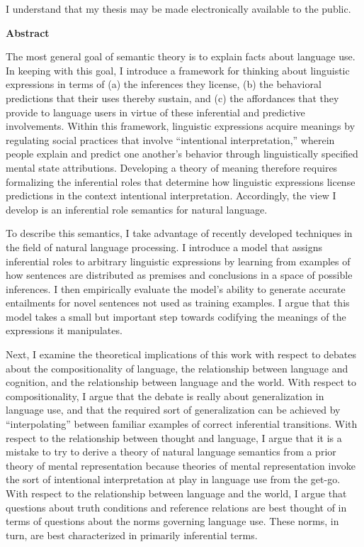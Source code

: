   \noindent
I understand that my thesis may be made electronically available to the public.

\cleardoublepage


\begin{center}\textbf{Abstract}\end{center}

The most general goal of semantic theory is to explain facts about language use. In keeping with this goal, I introduce a framework for thinking about linguistic expressions in terms of (a) the inferences they license, (b) the behavioral predictions that their uses thereby sustain, and (c) the affordances that they provide to language users in virtue of these inferential and predictive involvements. Within this framework, linguistic expressions acquire meanings by regulating social practices that involve ``intentional interpretation,'' wherein people explain and predict one another's behavior through linguistically specified mental state attributions. Developing a theory of meaning therefore requires formalizing the inferential roles that determine how linguistic expressions license predictions in the context intentional interpretation. Accordingly, the view I develop is an inferential role semantics for natural language.

To describe this semantics, I take advantage of recently developed techniques in the field of natural language processing. I introduce a model that assigns inferential roles to arbitrary linguistic expressions by learning from examples of how sentences are distributed as premises and conclusions in a space of possible inferences. I then empirically evaluate the model's ability to generate accurate entailments for novel sentences not used as training examples. I argue that this model takes a small but important step towards codifying the meanings of the expressions it manipulates.

Next, I examine the theoretical implications of this work with respect to debates about the compositionality of language, the relationship between language and cognition, and the relationship between language and the world. With respect to compositionality, I argue that the debate is really about generalization in language use, and that the required sort of generalization can be achieved by ``interpolating'' between familiar examples of correct inferential transitions. With respect to the relationship between thought and language, I argue that it is a mistake to try to derive a theory of natural language semantics from a prior theory of mental representation because theories of mental representation invoke the sort of intentional interpretation at play in language use from the get-go. With respect to the relationship between language and the world, I argue that questions about truth conditions and reference relations are best thought of in terms of questions about the norms governing language use. These norms, in turn, are best characterized in primarily inferential terms. 

